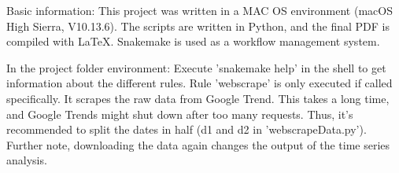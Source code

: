 Basic information:
This project was written in a MAC OS environment (macOS High Sierra, V10.13.6).
The scripts are written in Python, and the final PDF is compiled with LaTeX. Snakemake is used as a workflow management system.

In the project folder environment:
Execute 'snakemake help' in the shell to get information about the different rules.
Rule 'webscrape' is only executed if called specifically. It scrapes the raw data from Google Trend. This takes a long time, and Google Trends might shut down after too many requests. Thus, it's recommended to split the dates in half (d1 and d2 in 'webscrapeData.py'). Further note, downloading the data again changes the output of the time series analysis.
